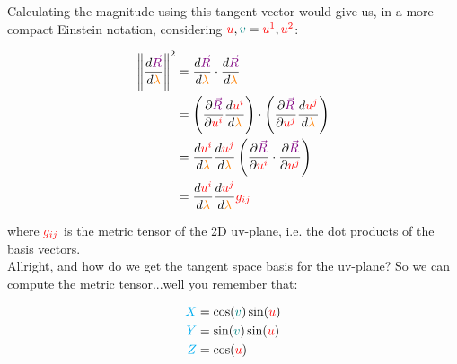 Calculating the magnitude using this tangent vector would give us, in a more compact Einstein notation, considering $\begingroup\color{red}u\endgroup, \begingroup\color{teal}v\endgroup = \begingroup\color{red}u^1\endgroup, \begingroup\color{red}u^2\endgroup$:

\begin{align*}
    \norm{\frac{d\begingroup\color{violet}\vec{R}\endgroup}{d\begingroup\color{orange}\lambda\endgroup}}^2 &=
    \frac{d\begingroup\color{violet}\vec{R}\endgroup}{d\begingroup\color{orange}\lambda\endgroup} \cdot \frac{d\begingroup\color{violet}\vec{R}\endgroup}{d\begingroup\color{orange}\lambda\endgroup}\\
    &= \left(\frac{\partial \begingroup\color{violet}\vec{R}\endgroup}{\partial \begingroup\color{red}u^i\endgroup} \frac{d \begingroup\color{red}u^i\endgroup}{d \begingroup\color{orange}\lambda\endgroup}\right) \cdot 
    \left(\frac{\partial \begingroup\color{violet}\vec{R}\endgroup}{\partial \begingroup\color{red}u^j\endgroup}\frac{d \begingroup\color{red}u^j\endgroup}{d \begingroup\color{orange}\lambda\endgroup}\right)\\
    &= \frac{d \begingroup\color{red}u^i\endgroup}{d \begingroup\color{orange}\lambda\endgroup} \frac{d \begingroup\color{red}u^j\endgroup}{d \begingroup\color{orange}\lambda\endgroup}
    \left(\frac{\partial \begingroup\color{violet}\vec{R}\endgroup}{\partial \begingroup\color{red}u^i\endgroup} \cdot \frac{\partial \begingroup\color{violet}\vec{R}\endgroup}{\partial \begingroup\color{red}u^j\endgroup}\right)\\
    &= \frac{d \begingroup\color{red}u^i\endgroup}{d \begingroup\color{orange}\lambda\endgroup} \frac{d \begingroup\color{red}u^j\endgroup}{d \begingroup\color{orange}\lambda\endgroup} \begingroup\color{red}g_{ij}\endgroup
\end{align*}

where $\color{red}g_{ij}$ is the metric tensor of the 2D uv-plane, i.e. the dot products of the basis vectors.\\

Allright, and how do we get the tangent space basis for the uv-plane? So we can compute the metric tensor...well you remember that:

\begin{align*}
    \begingroup\color{cyan}X\endgroup &= \cos(\begingroup\color{teal}v\endgroup)\sin(\begingroup\color{red}u\endgroup)\\
    \begingroup\color{cyan}Y\endgroup &= \sin(\begingroup\color{teal}v\endgroup)\sin(\begingroup\color{red}u\endgroup)\\
    \begingroup\color{cyan}Z\endgroup &= \cos(\begingroup\color{red}u\endgroup)
\end{align*}


